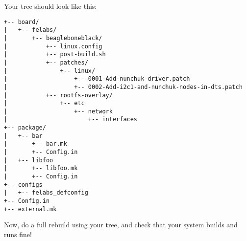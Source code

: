 Your  tree should look like this:

\begin{verbatim}
+-- board/
|   +-- felabs/
|       +-- beagleboneblack/
|           +-- linux.config
|           +-- post-build.sh
|           +-- patches/
|               +-- linux/
|                   +-- 0001-Add-nunchuk-driver.patch
|                   +-- 0002-Add-i2c1-and-nunchuk-nodes-in-dts.patch
|           +-- rootfs-overlay/
|               +-- etc
|                   +-- network
|                       +-- interfaces
+-- package/
|   +-- bar
|       +-- bar.mk
|       +-- Config.in
|   +-- libfoo
|       +-- libfoo.mk
|       +-- Config.in
+-- configs
|   +-- felabs_defconfig
+-- Config.in
+-- external.mk
\end{verbatim}

Now, do a full rebuild using your  tree, and check
that your system builds and runs fine!

